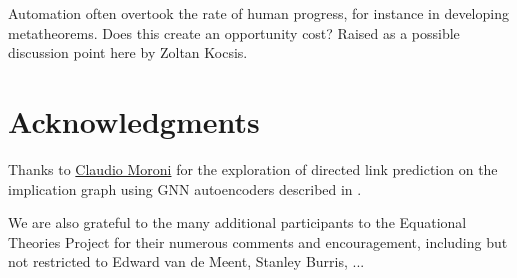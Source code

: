Automation often overtook the rate of human progress, for instance in developing metatheorems. Does this create an opportunity cost? Raised as a possible discussion point here by Zoltan Kocsis.

\section*{Acknowledgments}

Thanks to \href{https://github.com/ClaudMor}{Claudio Moroni} for the exploration of directed link prediction
on the implication graph using GNN autoencoders described in .

We are also grateful to the many additional participants to the Equational Theories Project for their numerous comments and encouragement, including but not restricted to Edward van de Meent, Stanley Burris, ...
